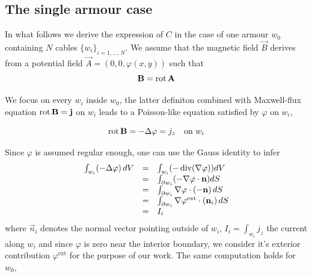 \subsection*{The single armour case}
In what follows we derive the expression of $C$ in the case of one armour $w_0$
containing $N$ cables $\{ w_i \}_{i=1,...,N}$. We assume that the magnetic
field $\vec{B}$ derives from a potential field $\vec{A}=(0,0,\varphi(x,y))$
such that 
\[
\label{def:B}
\mathbf B = \operatorname{rot}  \mathbf A
\]

We focus on every $w_i$ inside $w_0$, the latter definiton combined with
Maxwell-flux equation $\operatorname{rot} \mathbf B = \mathbf j$ on $w_i$ leads to a Poisson-like
equation satisfied by $\varphi$ on $w_i$,

\begin{equation}
\label{eq:poissonwi}
\operatorname{rot} \mathbf B = -\Delta \varphi = j_z \quad \text{on } w_i
\end{equation}

Since $\varphi$ is assumed regular enough, one can use the Gauss identity to infer
\begin{equation}
  \label{eq:traceeqn}
  \begin{array}{rcl}
    \int_{w_i} (-\Delta \varphi) \, dV &=& \int_{w_i} (- \operatorname{div} (\nabla \varphi))  dV \\
                                       &=& \int_{\partial w_i} (-\nabla\varphi \cdot \mathbf n) dS \\
                                       &=& \int_{\partial w_i} \nabla\varphi \cdot (-\mathbf n)  \, dS \\
                                       &=& \int_{ \partial w_i} \nabla\varphi^{\text{ext}} \cdot (\mathbf n_i)  \, dS \\
                                       &=& I_i \\
  \end{array}
\end{equation}
where $\vec{n}_i$ denotes the normal vector pointing outside of $w_i$,
$I_i=\int_{w_i}j_z$ the current along $w_i$ and since $\varphi$ is zero near
the interior boundary, we consider it's  exterior contribution
$\varphi^{\text{ext}}$ for the purpose of our work. The same computation holds
for $w_0$, 

